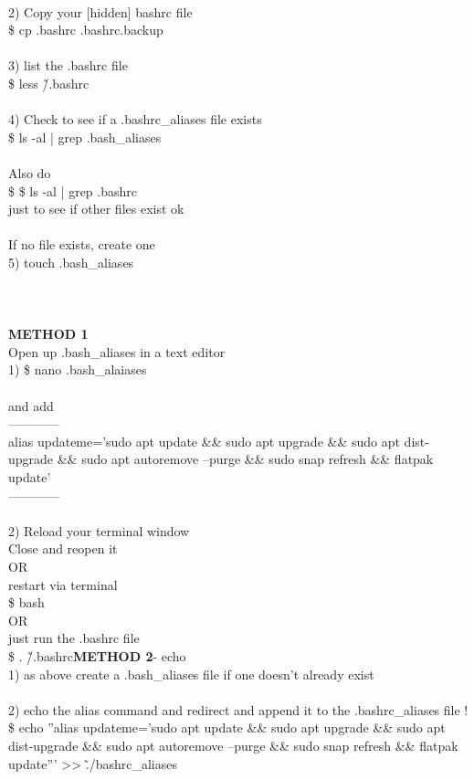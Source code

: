 \documentclass[10pt,a4paper]{article}
\begin{document}
{{{{{{{{{{{{{{{{{{{{{\\
2) Copy your [hidden] bashrc file\\
\$ cp .bashrc .bashrc.backup\\
\\
3) list the .bashrc file\\
\$ less \~/.bashrc}{\large \\
\\
4) Check to see if a .bashrc\_aliases file exists\\
\$ ls -al | grep .bash\_aliases\\
\\
Also do \\
\$ \$ ls -al | grep .bashrc\\
just to see if other files exist ok\\
\\
If no file exists, create one\\
5) touch .bash\_aliases\\
\\
\\
\\
\textbf{METHOD 1}}{\large \\
Open up .bash\_aliases in a text editor\\
1) \$ nano .bash\_alaiases\\
\\
and add\\
------------\\
alias updateme='sudo apt update \&\& sudo apt upgrade \&\& sudo apt dist-upgrade \&\& sudo apt autoremove --purge \&\& sudo snap refresh \&\& flatpak update'\\
------------\\
\\
2) Reload your terminal window\\
Close and reopen it \\
OR \\
restart via terminal\\
\$ bash\\
OR\\
just run the .bashrc file\\
\$ . \~/.bashrc}{\large \textbf{METHOD 2}}{\large  - echo\\
1) as above create a .bash\_aliases file if one doesn't already exist\\
\\
2) echo the alias command and redirect and append it to the .bashrc\_aliases file !\\
\$ echo ''alias updateme='sudo apt update \&\& sudo apt upgrade \&\& sudo apt dist-upgrade \&\& sudo apt autoremove --purge \&\& sudo snap refresh \&\& flatpak update''' >> \~./bashrc\_aliases\\
}}}}}}}}}}}}}}}}}}}}}
\end{document}
